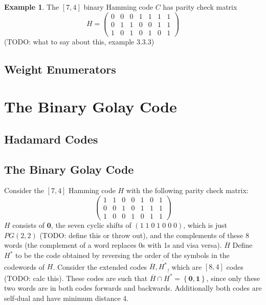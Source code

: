 \documentclass{article}
\newcommand{\ext}[1]{\overline{#1}}
\renewcommand{\=}{\equiv}
\newcommand{\set}[1]{\left\{ #1 \right\}}
\renewcommand{\v}{\mathbf}
\theoremstyle{plain}
\theoremstyle{definition}
\newtheorem{exmp}{Example}[subsection]
\newcommand{\TODO}[1]{(TODO: #1)}
\begin{document}
\begin{exmp}
The $[7,4]$ binary Hamming code $C$ has parity check matrix
$$ H = \begin{pmatrix}
  0 & 0 & 0 & 1 & 1 & 1 & 1 \\
  0 & 1 & 1 & 0 & 0 & 1 & 1 \\
  1 & 0 & 1 & 0 & 1 & 0 & 1
\end{pmatrix} $$
\TODO{what to say about this, example 3.3.3}
\end{exmp}


\subsection{Weight Enumerators}

\section{The Binary Golay Code}

\subsection{Hadamard Codes}

\subsection{The Binary Golay Code}

Consider the $[7,4]$ Hamming code $H$ with the following parity check matrix:
$$ \begin{pmatrix}
  1 & 1 & 0 & 0 & 1 & 0 & 1 \\
  0 & 0 & 1 & 0 & 1 & 1 & 1 \\
  1 & 0 & 0 & 1 & 0 & 1 & 1
\end{pmatrix} $$
$H$ consists of $\v 0$, the seven cyclic shifts of $(1\;1\;0\;1\;0\;0\;0)$, which is just $PG(2,2)$ \TODO{define this or throw out}, and the complements of these 8 words (the complement of a word replaces 0s with 1s and visa versa).
$\ext{H}$
Define $H^*$ to be the code obtained by reversing the order of the symbols in the codewords of $H$.
Consider the extended codes $\ext{H}, \ext{H^*}$, which are $[8,4]$ codes \TODO{calc this}.
These codes are such that $\ext{H} \cap \ext{H^*} = \set{ \v 0, \v 1 }$, since only these two words are in both codes forwards and backwards. Additionally both codes are self-dual and have minimum distance 4.
\end{document}
